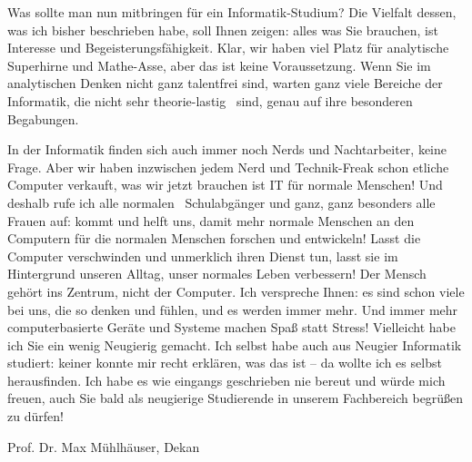 {    Was sollte man nun mitbringen für ein Informatik-Studium? Die Vielfalt dessen, was ich bisher beschrieben habe, soll Ihnen zeigen: alles was Sie brauchen, ist Interesse und Begeisterungsfähigkeit. Klar, wir haben viel Platz für analytische Superhirne und Mathe-Asse, aber das ist keine Voraussetzung. Wenn Sie im analytischen Denken nicht ganz talentfrei sind, warten ganz viele Bereiche der Informatik, die nicht \glqq sehr theorie-lastig\grqq~ sind, genau auf ihre besonderen Begabungen.

    In der Informatik finden sich auch immer noch Nerds und Nachtarbeiter, keine Frage. Aber wir haben inzwischen jedem Nerd und Technik-Freak schon etliche Computer verkauft, was wir jetzt brauchen ist IT für normale Menschen! Und deshalb rufe ich alle \glqq normalen\grqq~ Schulabgänger und ganz, ganz besonders alle Frauen auf: kommt und helft uns, damit mehr normale Menschen an den Computern für die normalen Menschen forschen und entwickeln! Lasst die Computer verschwinden und unmerklich ihren Dienst tun, lasst sie im Hintergrund unseren Alltag, unser normales Leben verbessern! Der Mensch gehört ins Zentrum, nicht der Computer. Ich verspreche Ihnen: es sind schon viele bei uns, die so denken und fühlen, und es werden immer mehr. Und immer mehr computerbasierte Geräte und Systeme machen Spaß statt Stress!
    Vielleicht habe ich Sie ein wenig Neugierig gemacht. Ich selbst habe auch aus Neugier Informatik studiert: keiner konnte mir recht erklären, was das ist -- da wollte ich es selbst herausfinden. Ich habe es wie eingangs geschrieben nie bereut und würde mich freuen, auch Sie bald als neugierige Studierende in unserem Fachbereich begrüßen zu dürfen!
}{Prof. Dr. Max Mühlhäuser, Dekan}
